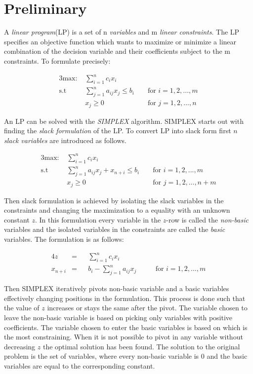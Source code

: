 
\section{Preliminary}
A \textit{linear program}(LP) is a set of n \textit{variables} and m \textit{linear constraints}. The LP specifies an objective function which wants to maximize or minimize a linear combination of the decision variable and their coefficients subject to the m constraints. To formulate precisely:

\begin{alignat}{3}
\text{max: } &\sum_{i=1}^{n} c_i x_i\\
\text{s.t }  & \sum_{j=1}^{n} a_{ij} x_j \leq b_i && \text{ for } i=1,2,...,m\\
             & x_j \geq 0                         && \text{ for } j=1,2,...,n 
\end{alignat}

An LP can be solved with the \textit{SIMPLEX} algorithm. SIMPLEX starts out with finding the \textit{slack formulation} of the LP. To convert LP into slack form first $n$ \textit{slack variables} are introduced as follows.

\begin{alignat}{3}
\text{max: } &\sum_{i=1}^{n} c_i x_i\\
\text{s.t }  & \sum_{j=1}^{n} a_{ij} x_j + x_{n+i} \leq b_i  && \text{ for } i=1,2,...,m\\
             & x_j \geq 0                                    && \text{ for } j=1,2,...,n+m
\end{alignat}

Then slack formulation is achieved by isolating the slack variables in the constraints and changing the maximization to a equality with an unknown constant $z$. In this formulation every variable in the $z$-row is called the \textit{non-basic} variables and the isolated variables in the constraints are called the \textit{basic} variables. The formulation is as follows:

\begin{alignat}{4}
z        &= && \sum_{i=1}^{n} c_ix_i\\
x_{n+i}  &= && b_i - \sum_{j=1}^{n} a_{ij} x_j  &&& \text{ for } i=1,2,...,m
\end{alignat}

Then SIMPLEX iteratively pivots non-basic variable and a basic variables effectively changing positions in the formulation. This process is done such that the value of $z$ increases or stays the same after the pivot. The variable chosen to leave the non-basic variable is based on picking only variables with positive coefficients. The variable chosen to enter the basic variables is based on which is the most constraining. When it is not possible to pivot in any variable without decreasing $z$ the optimal solution has been found. The solution to the original problem is the set of variables, where every non-basic variable is 0 and the basic variables are equal to the corresponding constant.

